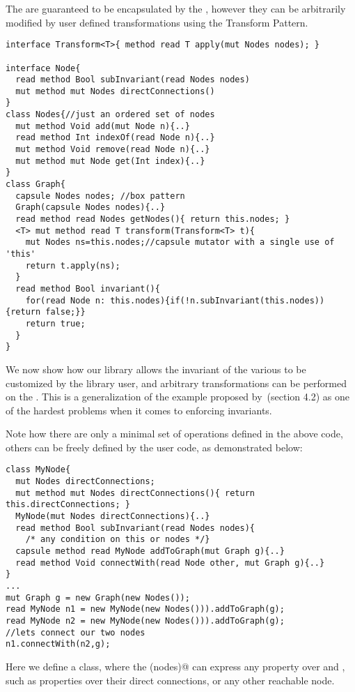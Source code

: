 The \Q@Node@s are guaranteed to be encapsulated by the \Q@Graph@, however they can be arbitrarily modified by user defined transformations using the Transform Pattern.
\begin{lstlisting}
interface Transform<T>{ method read T apply(mut Nodes nodes); }

interface Node{
  read method Bool subInvariant(read Nodes nodes)
  mut method mut Nodes directConnections()
}
class Nodes{//just an ordered set of nodes 
  mut method Void add(mut Node n){..}
  read method Int indexOf(read Node n){..}
  mut method Void remove(read Node n){..}
  mut method mut Node get(Int index){..}
}
class Graph{ 
  capsule Nodes nodes; //box pattern
  Graph(capsule Nodes nodes){..}
  read method read Nodes getNodes(){ return this.nodes; }
  <T> mut method read T transform(Transform<T> t){
    mut Nodes ns=this.nodes;//capsule mutator with a single use of 'this'
    return t.apply(ns);
  }
  read method Bool invariant(){
    for(read Node n: this.nodes){if(!n.subInvariant(this.nodes)){return false;}}
    return true;
  }
}
\end{lstlisting}
We now show how our \Q@Graph@ library allows the invariant of the various \Q@Node@s to be customized by the library user, and arbitrary transformations can be performed on the \Q@Graph@s. This is a generalization of the example proposed by~\cite{Summers:2009:NFO:1562154.1562160}(section 4.2) as one of the hardest problems when it comes to enforcing invariants.

Note how there are only a minimal set of operations defined in the above code, 
others can be freely defined by the user code, as demonstrated below:

\begin{lstlisting}
class MyNode{
  mut Nodes directConnections;
  mut method mut Nodes directConnections(){ return this.directConnections; }
  MyNode(mut Nodes directConnections){..}
  read method Bool subInvariant(read Nodes nodes){
    /* any condition on this or nodes */}  
  capsule method read MyNode addToGraph(mut Graph g){..}
  read method Void connectWith(read Node other, mut Graph g){..}
}
...
mut Graph g = new Graph(new Nodes());
read MyNode n1 = new MyNode(new Nodes())).addToGraph(g);
read MyNode n2 = new MyNode(new Nodes())).addToGraph(g);
//lets connect our two nodes
n1.connectWith(n2,g);
\end{lstlisting}
Here we define a \Q@MyNode@ class, where the \Q@subInvariant(nodes)@ can express any property over \Q@this@ and \Q@nodes@, such as properties over their direct connections, or any other reachable node.

